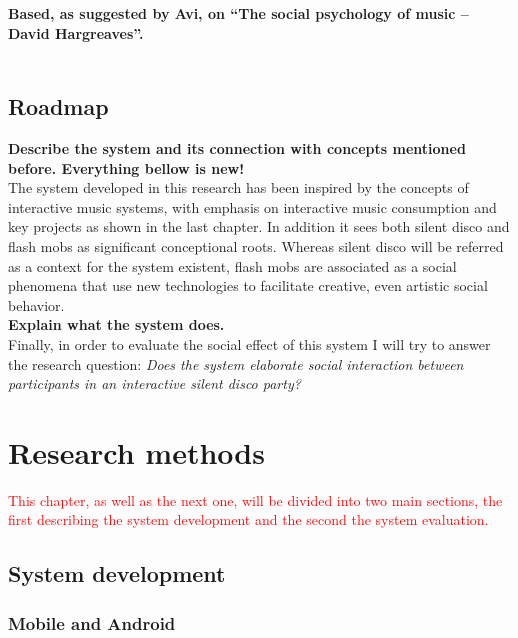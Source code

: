 \documentclass[a4paper,11pt]{article}
\begin{document}
\textbf{Based, as suggested by Avi, on ``The social psychology of music -- David Hargreaves''.}\\

\textcolor{red}{}\\


\subsection{Roadmap}

\textbf{Describe the system and its connection with concepts mentioned before. Everything bellow is new!}\\

The system developed in this research has been inspired by the concepts of interactive music systems, with emphasis on interactive music consumption and key projects as shown in the last chapter. In addition it sees both silent disco and flash mobs as significant conceptional roots. Whereas silent disco will be referred as a context for the system existent, flash mobs are associated as a social phenomena that use new technologies to facilitate creative, even artistic social behavior.\\

\textbf{Explain what the system does.}\\

Finally, in order to evaluate the social effect of this system I will try to answer the research question: \emph{Does the system elaborate social interaction between participants in an interactive silent disco party?}\\


\section{Research methods}

\textcolor{red}{This chapter, as well as the next one, will be divided into two main sections, the first describing the system development and the second the system evaluation.}\\


\subsection{System development}


\subsubsection{Mobile and Android}
\end{document}
